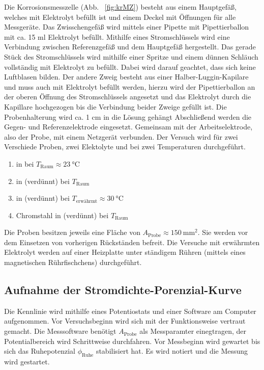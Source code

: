 \documentclass[11pt,a4paper]{article}
\numberwithin{equation}{section}
\begin{document}
\noindent Die Korrosionsmesszelle (Abb. ~\ref{fig:krMZ}) besteht aus einem Hauptgef\"a{\ss}, welches mit Elektrolyt bef\"ullt ist und einem Deckel mit \"Offnungen f\"ur alle Messger\"ate. Das Zwisschengef\"a{\ss} wird mittels einer Pipette mit Pipettierballon mit ca. 15 ml Elektrolyt bef\"ullt. Mithilfe eines Stromschl\"ussels  wird eine Verbindung zwischen Referenzgef\"a{\ss} und dem Hauptgef\"a{\ss}  hergestellt. Das gerade St\"uck des Stromschl\"ussels wird mithilfe einer Spritze und einem d\"unnen Schl\"auch vollst\"andig mit Elektrolyt zu bef\"ullt. Dabei wird darauf geachtet, dass sich keine Luftblasen bilden. Der andere Zweig besteht aus einer Halber-Luggin-Kapilare und muss auch mit Elektrolyt bef\"ullt werden, hierzu wird der Pipettierballon an der oberen \"Offnung des Stromschl\"ussels angesetzt und das Elektrolyt durch die Kapillare hochgezogen bis die Verbindung beider Zweige gef\"ullt ist. Die Probenhalterung wird ca. 1 cm in die L\"osung geh\"angt 
\newline Abschlie{\ss}end werden die Gegen- und Referenzelektrode eingesetzt. Gemeinsam mit der Arbeitselektrode, also der Probe,  mit einem Netzger\"at verbunden.
Der Versuch wird f\"ur zwei Verschiede Proben, zwei Elektolyte und bei zwei Temperaturen durchgef\"uhrt.
\begin{enumerate}[label = \Alph*)]
\item {} in  bei $T_{\text{Raum}} \approx \qty{23}{\degreeCelsius}$
\item {} in  (verd\"unnt) bei $T_{\text{Raum}}$
\item {} in  (verd\"unnt) bei $T_{\text{erw\"ahrmt}} \approx \qty{30}{\degreeCelsius}$ 
\item Chromstahl in  (verd\"unnt) bei $T_{\text{Raum}}$
\end{enumerate}
Die Proben besitzen jeweils eine Fl\"ache von $A_{\text{Probe}} \approx \qty{150}{\milli\metre\squared}$. Sie werden vor dem Einsetzen von vorherigen R\"uckst\"anden befreit.
Die Versuche mit erw\"ahrmten Elektrolyt werden auf einer Heizplatte unter st\"andigem R\"uhren (mittels eines magnetischen R\"uhrfischchens) durchgef\"uhrt.

\subsection{Aufnahme der Stromdichte-Porenzial-Kurve}
Die Kennlinie wird mithilfe eines Potentiostats und einer Software am Computer aufgenommen. Vor Versuchsbeginn wird sich mit der Funktionsweise vertraut gemacht. 
Die Messsoftware ben\"otigt $A_{\text{Probe}}$ als Messparamter einegtragen, der Potentialbereich wird Schrittweise durchfahren. 
Vor Messbeginn wird gewartet bis sich das Ruhepotenzial $\phi_{\text{Ruhe}}$ stabilisiert hat. Es wird notiert und die Messung wird gestartet.
\end{document}
